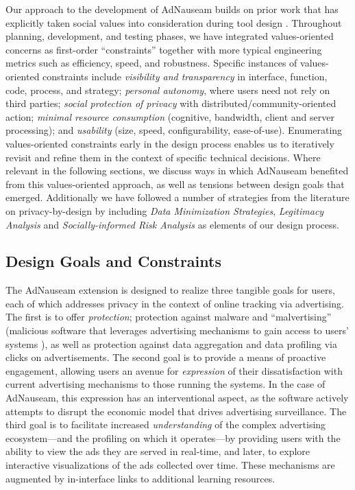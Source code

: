 \documentclass[conference]{IEEEtran}
\begin{document}
Our approach to the development of AdNauseam builds on prior work that has explicitly taken social values into consideration during tool design \cite{Friedman,Flanagan,Howe-1}. Throughout planning, development, and testing phases, we have integrated values-oriented concerns as first-order “constraints” together with more typical engineering metrics such as efficiency, speed, and robustness. Specific instances of values-oriented constraints include \emph{visibility and transparency} in interface, function, code, process, and strategy; \emph{personal autonomy}, where users need not rely on third parties; \emph{social protection of privacy} with distributed/community-oriented action; \emph{minimal resource consumption} (cognitive, bandwidth, client and server processing); and \emph{usability} (size, speed, configurability, ease-of-use). Enumerating values-oriented constraints early in the design process enables us to iteratively revisit and refine them in the context of specific technical decisions. Where relevant in the following sections, we discuss ways in which AdNauseam benefited from this values-oriented approach, as well as tensions between design goals that emerged. Additionally we have followed a number of strategies from the literature on privacy-by-design \cite{Gurses-0, Hoepman, Gurses-1, Hansen, Cavoukian} by including \emph{Data Minimization Strategies}, \emph{Legitimacy Analysis} and \emph{Socially-informed Risk Analysis} as elements of our design process.


\subsection{Design Goals and Constraints}

The AdNauseam extension is designed to realize three tangible goals for users, each of which addresses privacy in the context of online tracking via advertising. The first is to offer \emph{protection}; protection against malware and “malvertising” (malicious software that leverages advertising mechanisms to gain access to users' systems \cite{Mansfield}), as well as protection against data aggregation and data profiling via clicks on advertisements. The second goal is to provide a means of proactive engagement, allowing users an avenue for \emph{expression} of their dissatisfaction with current advertising mechanisms to those running the systems. In the case of AdNauseam, this expression has an interventional aspect, as the software actively attempts to disrupt the economic model that drives advertising surveillance. The third goal is to facilitate increased \emph{understanding} of the complex advertising ecosystem---and the profiling on which it operates---by providing users with the ability to view the ads they are served in real-time, and later, to explore interactive visualizations of the ads collected over time. These mechanisms are augmented by in-interface links to additional learning resources.
\end{document}
